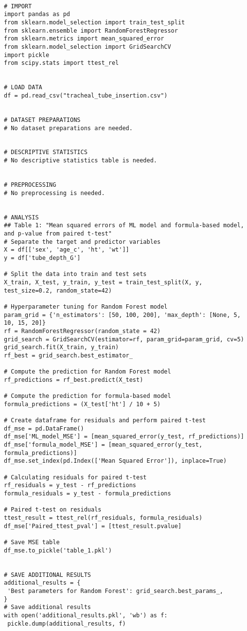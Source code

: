 \documentclass[11pt]{article}
\begin{document}
\begin{verbatim}

# IMPORT
import pandas as pd
from sklearn.model_selection import train_test_split
from sklearn.ensemble import RandomForestRegressor
from sklearn.metrics import mean_squared_error
from sklearn.model_selection import GridSearchCV
import pickle
from scipy.stats import ttest_rel


# LOAD DATA
df = pd.read_csv("tracheal_tube_insertion.csv")


# DATASET PREPARATIONS
# No dataset preparations are needed.


# DESCRIPTIVE STATISTICS
# No descriptive statistics table is needed.


# PREPROCESSING 
# No preprocessing is needed.


# ANALYSIS
## Table 1: "Mean squared errors of ML model and formula-based model, and p-value from paired t-test"
# Separate the target and predictor variables
X = df[['sex', 'age_c', 'ht', 'wt']]
y = df['tube_depth_G']

# Split the data into train and test sets
X_train, X_test, y_train, y_test = train_test_split(X, y, test_size=0.2, random_state=42)

# Hyperparameter tuning for Random Forest model
param_grid = {'n_estimators': [50, 100, 200], 'max_depth': [None, 5, 10, 15, 20]}
rf = RandomForestRegressor(random_state = 42)
grid_search = GridSearchCV(estimator=rf, param_grid=param_grid, cv=5)
grid_search.fit(X_train, y_train)
rf_best = grid_search.best_estimator_

# Compute the prediction for Random Forest model
rf_predictions = rf_best.predict(X_test)

# Compute the prediction for formula-based model
formula_predictions = (X_test['ht'] / 10 + 5)

# Create dataframe for residuals and perform paired t-test
df_mse = pd.DataFrame()
df_mse['ML_model_MSE'] = [mean_squared_error(y_test, rf_predictions)]
df_mse['formula_model_MSE'] = [mean_squared_error(y_test, formula_predictions)]
df_mse.set_index(pd.Index(['Mean Squared Error']), inplace=True)

# Calculating residuals for paired t-test
rf_residuals = y_test - rf_predictions
formula_residuals = y_test - formula_predictions

# Paired t-test on residuals
ttest_result = ttest_rel(rf_residuals, formula_residuals)
df_mse['Paired_ttest_pval'] = [ttest_result.pvalue]

# Save MSE table
df_mse.to_pickle('table_1.pkl')


# SAVE ADDITIONAL RESULTS
additional_results = {
 'Best parameters for Random Forest': grid_search.best_params_, 
}
# Save additional results
with open('additional_results.pkl', 'wb') as f:
 pickle.dump(additional_results, f)

\end{verbatim}
\end{document}
